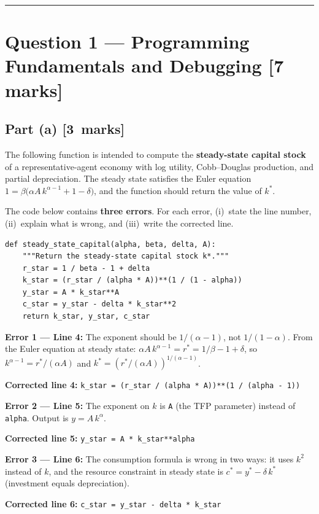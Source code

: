 \documentclass[11pt,a4paper]{article}
\newcommand{\mkpts}[1]{\hfill\textbf{[#1~marks]}}
\begin{document}
\vspace{6pt}
\hrule
\vspace{12pt}


\section*{Question 1 --- Programming Fundamentals and Debugging \hfill [7 marks]}

\subsection*{Part (a) \mkpts{3}}

The following function is intended to compute the \textbf{steady-state capital stock} of a representative-agent economy with log utility, Cobb--Douglas production, and partial depreciation.  The steady state satisfies the Euler equation $1 = \beta\bigl(\alpha A\,k^{\alpha-1} + 1 - \delta\bigr)$, and the function should return the value of $k^*$.

\medskip

The code below contains \textbf{three errors}.  For each error, (i)~state the line number, (ii)~explain what is wrong, and (iii)~write the corrected line.

\begin{lstlisting}
def steady_state_capital(alpha, beta, delta, A):
    """Return the steady-state capital stock k*."""
    r_star = 1 / beta - 1 + delta
    k_star = (r_star / (alpha * A))**(1 / (1 - alpha))
    y_star = A * k_star**A
    c_star = y_star - delta * k_star**2
    return k_star, y_star, c_star
\end{lstlisting}

\begin{solution}
\textbf{Error 1 --- Line 4:} The exponent should be $1/(\alpha-1)$, not $1/(1-\alpha)$.  From the Euler equation at steady state: $\alpha A\, k^{\alpha-1} = r^* = 1/\beta - 1 + \delta$, so $k^{\alpha-1} = r^*/(\alpha A)$ and $k^* = (r^*/(\alpha A))^{1/(\alpha-1)}$.

\textbf{Corrected line 4:} \texttt{k\_star = (r\_star / (alpha * A))**(1 / (alpha - 1))}

\medskip

\textbf{Error 2 --- Line 5:} The exponent on $k$ is \texttt{A} (the TFP parameter) instead of \texttt{alpha}.  Output is $y = A\,k^{\alpha}$.

\textbf{Corrected line 5:} \texttt{y\_star = A * k\_star**alpha}

\medskip

\textbf{Error 3 --- Line 6:} The consumption formula is wrong in two ways: it uses $k^2$ instead of $k$, and the resource constraint in steady state is $c^* = y^* - \delta\,k^*$ (investment equals depreciation).

\textbf{Corrected line 6:} \texttt{c\_star = y\_star - delta * k\_star}
\end{solution}
\end{document}
